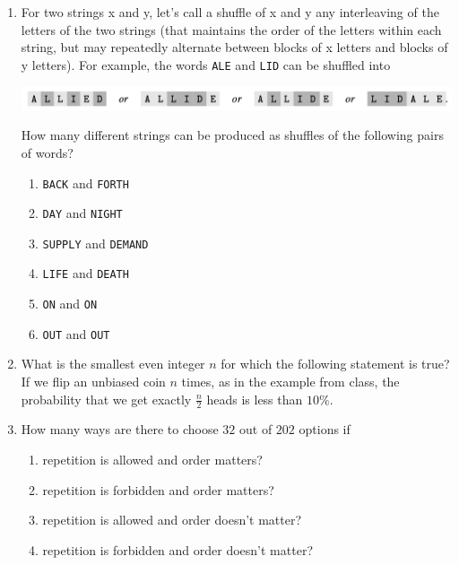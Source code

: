 \documentclass[11pt, oneside]{article}   	%
\begin{document}
\begin{enumerate}
 \item
For two strings x and y, let’s call a shuffle of x and y any interleaving of the letters of the two strings (that maintains the order of the letters within each string, but may repeatedly alternate between blocks of x letters and blocks of y letters). For example, the words \texttt{ALE} and \texttt{LID} can be shuffled into\\
\begin{center} \includegraphics[width=.9\textwidth]{HW5_shuffle} \end{center}
 How many different strings can be produced as shuffles of the following pairs of words?
\begin{enumerate}
\item \texttt{BACK} and \texttt{FORTH}
\item \texttt{DAY} and \texttt{NIGHT}
\item \texttt{SUPPLY} and \texttt{DEMAND}
\item \texttt{LIFE} and \texttt{DEATH}
\item \texttt{ON} and \texttt{ON}
\item \texttt{OUT} and \texttt{OUT}
\end{enumerate}

\item What is the smallest even integer $n$ for which the following statement is true?
If we flip an unbiased coin $n$ times, as in the example from class,
the probability that we get exactly $\frac{n}{2}$ heads is less than $10\%$.

\item 
How many ways are there to choose $32$ out of $202$ options if 
\begin{enumerate}
\item repetition is allowed and order matters?
\item repetition is forbidden and order matters?
\item repetition is allowed and order doesn't matter?
\item repetition is forbidden and order doesn't matter?
\end{enumerate}


\end{enumerate}
\end{document}
